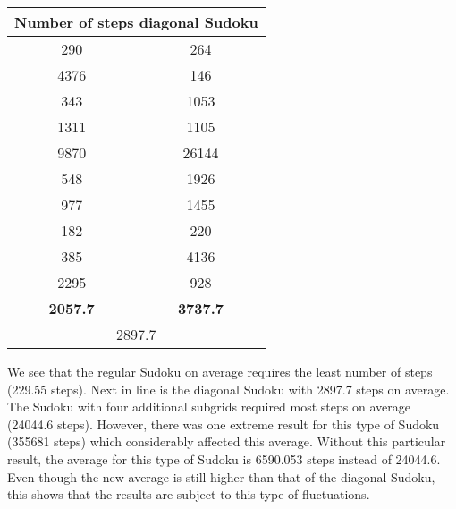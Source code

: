 \documentclass[12pt,a4paper]{article}
\begin{document}
\begin{center}
 \begin{tabular}{|c | c |}
 \hline
 \multicolumn{2}{|c|}{\textbf{Number of steps diagonal Sudoku}} \\[0.5ex]
 \hline\hline
 290 & 264  \\
 \hline
 4376 & 146 \\
 \hline
 343 & 1053 \\
 \hline
 1311 & 1105 \\
 \hline
 9870 & 26144 \\
 \hline
 548 & 1926 \\
 \hline
 977 & 1455 \\
 \hline
 182 & 220 \\
 \hline
 385 & 4136 \\
 \hline
 2295 & 928 \\
 \hline\hline
 \textbf{2057.7} & \textbf{3737.7} \\
 \hline
 \multicolumn{2}{|c|}{2897.7} \\
 \hline
\end{tabular}
\end{center}

We see that the regular Sudoku on average requires the least number of steps (229.55 steps). Next
in line is the diagonal Sudoku with 2897.7 steps on average. The Sudoku with four
additional subgrids required most steps on average (24044.6 steps). However, there was
one extreme result for this type of Sudoku (355681 steps) which considerably affected this
average. Without this particular result, the average for this type of Sudoku is 6590.053 steps instead of
24044.6. Even though the new average is still higher than that of the diagonal Sudoku,
this shows that the results are subject to this type of fluctuations.
\end{document}
